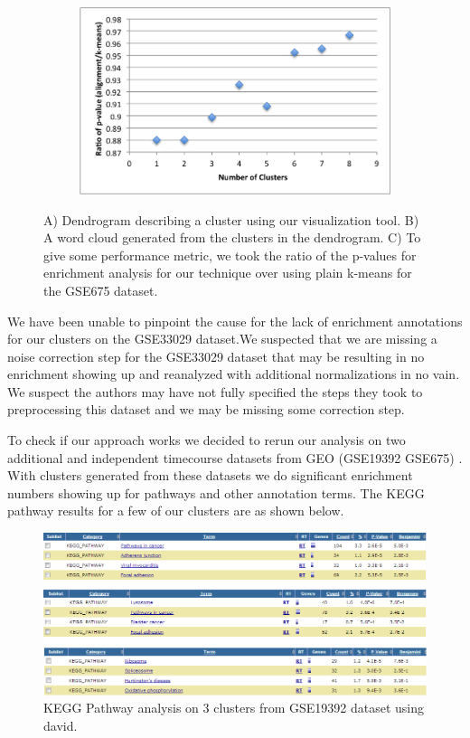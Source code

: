 \documentclass[aps,prd,final,onecolumn,a4paper,10pt]{revtex4}
\begin{document}
\begin{figure}[H]
  \begin{subfigure}[b]{0.8\textwidth}
    \includegraphics[width=.7\textwidth]{pvalue_performace.png}
    \label{fig:pvalue}
  \end{subfigure}%
  \label{fig:enrichment}
  \caption{A) Dendrogram describing a cluster using our visualization tool. B) A word cloud generated from the clusters in the dendrogram. C) To give some performance metric, we took the ratio of the p-values for enrichment analysis for our technique over using plain k-means for the GSE675 dataset.}
\end{figure}

We have been unable to pinpoint the cause for the lack of enrichment annotations for our clusters on the GSE33029 dataset.We suspected that we are missing a noise correction step for the GSE33029 dataset that may be resulting in no enrichment showing up and reanalyzed with additional normalizations in no vain. We suspect the authors may have not fully specified the steps they took to preprocessing this dataset and we may be missing some correction step.

To check if our approach works we decided to rerun our analysis on two additional and independent timecourse datasets from GEO (GSE19392 GSE675) . With clusters generated from these datasets we do significant enrichment numbers showing up for pathways and other annotation terms. The KEGG pathway results for a few of our clusters are as shown below. 


\begin{figure}[H]
\centering
\includegraphics[scale=0.65]{3Clusters_PathwayCombined.png}
\caption{KEGG Pathway analysis on 3 clusters from GSE19392 dataset using david.}
\label{fig:KEGGPathway.}
\end{figure}
\end{document}
